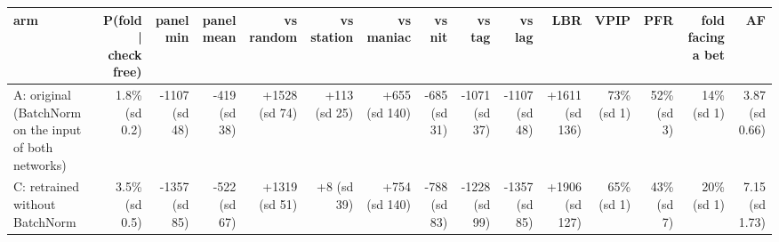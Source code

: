 \begin{tabular}{lrrrrrrrrrrrrrr}
\toprule
arm & P(fold | check free) & panel min & panel mean & vs random & vs station & vs maniac & vs nit & vs tag & vs lag & LBR & VPIP & PFR & fold facing a bet & AF \\
\midrule
A: original (BatchNorm on the input of both networks) & 1.8\% (sd 0.2) & -1107 (sd 48) & -419 (sd 38) & +1528 (sd 74) & +113 (sd 25) & +655 (sd 140) & -685 (sd 31) & -1071 (sd 37) & -1107 (sd 48) & +1611 (sd 136) & 73\% (sd 1) & 52\% (sd 3) & 14\% (sd 1) & 3.87 (sd 0.66) \\
C: retrained without BatchNorm & 3.5\% (sd 0.5) & -1357 (sd 85) & -522 (sd 67) & +1319 (sd 51) & +8 (sd 39) & +754 (sd 140) & -788 (sd 83) & -1228 (sd 99) & -1357 (sd 85) & +1906 (sd 127) & 65\% (sd 1) & 43\% (sd 7) & 20\% (sd 1) & 7.15 (sd 1.73) \\
\bottomrule
\end{tabular}
